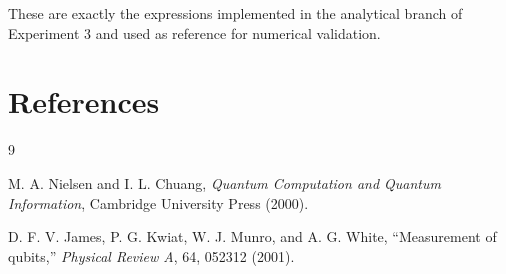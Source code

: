 \documentclass[a4paper]{article}
\begin{document}
These are exactly the expressions implemented in the analytical branch of Experiment 3 and used as reference for numerical validation.

\section{References}

\begin{thebibliography}{9}

M. A. Nielsen and I. L. Chuang,
\textit{Quantum Computation and Quantum Information},
Cambridge University Press (2000).

D. F. V. James, P. G. Kwiat, W. J. Munro, and A. G. White,
``Measurement of qubits,''
\textit{Physical Review A}, 64, 052312 (2001).

\end{thebibliography}
\end{document}
